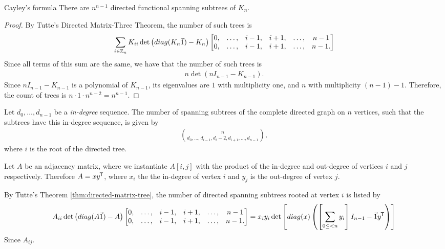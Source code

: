 \begin{cor}{Cayley's formula}\label{cor:cayley-formula}\proofbreak
    There are $n^{n-1}$ directed functional spanning subtrees of $K_{n}$.
\end{cor}

\begin{proof}
    By Tutte's Directed Matrix-Three Theorem, the number of such trees is
    \begin{align*}
        \sum_{i\in\mathbb{Z}_n}K_{ii}\det\left(diag(K_n\vec{1}) - K_n\right)\begin{bmatrix}
            0, &\ldots, &i-1, &i+1, &\ldots, &n-1 \\
            0, &\ldots, &i-1, &i+1, &\ldots, &n-1.
        \end{bmatrix}
    \end{align*}
    Since all terms of this sum are the same, we have that the number of such trees is
    \begin{align*}
        n\det(nI_{n-1}-K_{n-1}).
    \end{align*}
    Since $nI_{n-1} - K_{n-1}$ is a polynomial of $K_{n-1}$, its eigenvalues are $1$ with multiplicity one, and $n$ with multiplicity $(n-1)-1$. Therefore, the count of trees is $n\cdot 1 \cdot n^{n-2} = n^{n-1}$.
\end{proof}

\begin{cor}
    Let $d_0, \ldots, d_{n-1}$ be a \emph{in-degree} sequence. The number of spanning subtrees of the complete directed graph on $n$ vertices, such that the subtrees have this in-degree sequence, is given by
    \begin{align*}
        \binom{n}{d_0, \ldots, d_{i-1}, d_{i}-2, d_{i+1}, \ldots, d_{n-1}},
    \end{align*}
    where $i$ is the root of the directed tree.
\end{cor}

\begin{cor}
    Let $A$ be an adjacency matrix, where we instantiate $A[i,j]$ with the product of the in-degree and out-degree of vertices $i$ and $j$ respectively. Therefore $A = xy^{\mkern-1.5mu\mathsf{T}}$, where $x_i$ the the in-degree of vertex $i$ and $y_j$ is the out-degree of vertex $j$.

    By Tutte's Theorem \ref{thm:directed-matrix-tree}, the number of directed spanning subtrees rooted at vertex $i$ is listed by
    \begin{align*}
        A_{ii}\det\left(diag(A\vec{1}) - A\right)\begin{bmatrix}
            0, &\ldots, &i-1, &i+1, &\ldots, &n-1 \\
            0, &\ldots, &i-1, &i+1, &\ldots, &n-1.
        \end{bmatrix} = x_iy_i\det\left[diag(x)\left(\left[\sum_{0\leq < n}y_i\right]I_{n-1} - \vec{1}y^{\mkern-1.5mu\mathsf{T}}\right)\right]
    \end{align*}
    Since $A_{ij}$.
\end{cor}
